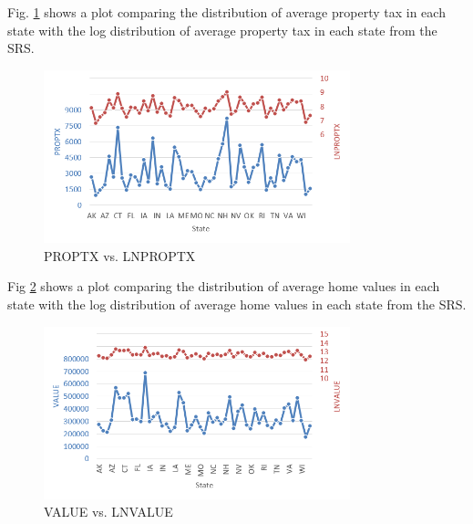 Fig. \ref{figure:PROPTX_Comparison} shows a plot comparing the distribution of average property tax in each state with the log distribution of average property tax in each state from the SRS.

\begin{figure}[h!]
	\centering
	\includegraphics[width=3.5in]{./fig/PROPTX_Comparison.PNG}
	\caption{PROPTX vs. LNPROPTX}
	\label{figure:PROPTX_Comparison}
\end{figure}

Fig \ref{figure:VALUE_Comparison} shows a plot comparing the distribution of average home values in each state with the log distribution of average home values in each state from the SRS.

\begin{figure}[h!]
	\centering
	\includegraphics[width=3.5in]{./fig/VALUE_Comparison.PNG}
	\caption{VALUE vs. LNVALUE}
	\label{figure:VALUE_Comparison}
\end{figure}
